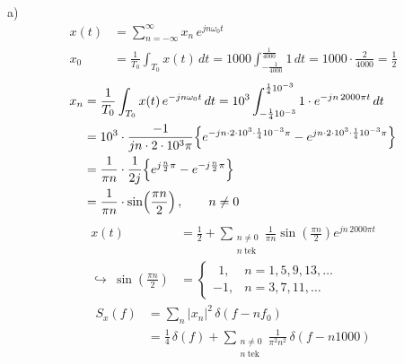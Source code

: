 \documentclass[11pt,a4paper]{article}
\begin{document}
\noindent a)
\begin{align*}
x(t)&=\sum_{n=-\infty}^{\infty}x_n\,e^{jn\omega_0 t}\\
x_0&=\frac{1}{T_0}\int_{T_0}x(t)\,dt=1000\int_{-\frac{1}{4000}}^{\frac{1}{4000}}1\,dt=1000\cdot\frac{2}{4000}=\frac12
\end{align*}
\begin{align*}
x_n &= \frac{1}{T_0}\int_{T_0}x(t)\,e^{-jn\omega_0 t}\,dt = 10^3\int_{-\frac14 10^{-3}}^{\frac14 10^{-3}}1\cdot e^{-jn\,2000\pi t}\,dt\\
 &= 10^3\cdot\frac{-1}{jn\cdot 2\cdot 10^3\pi}\Bigl\{e^{-jn\cdot 2\cdot 10^3\cdot\frac14 10^{-3}\pi}-e^{jn\cdot 2\cdot 10^3\cdot\frac14 10^{-3}\pi}\Bigr\}\\
 &= \frac{1}{\pi n}\cdot\frac{1}{2j}\Bigl\{e^{j\frac{n}{2}\pi}-e^{-j\frac{n}{2}\pi}\Bigr\}\\
 &= \frac{1}{\pi n}\cdot\sin\!\left(\frac{\pi n}{2}\right),\qquad n\neq 0
\end{align*}
\begin{align*}
x(t) &= \frac12+\sum_{\substack{n\neq 0\\ n\ \text{tek}}}\frac{1}{\pi n}\sin\!\left(\frac{\pi n}{2}\right)e^{jn\,2000\pi t}\\
\hookrightarrow\ \sin\!\left(\frac{\pi n}{2}\right) &=\begin{cases}\ \ 1, & n=1,5,9,13,\ldots\\ -1, & n=3,7,11,\ldots\end{cases}
\end{align*}
\begin{align*}
S_x(f) &= \sum_n |x_n|^2\,\delta(f-nf_0)\\
 &= \frac14\,\delta(f)+\sum_{\substack{n\neq0\\ n\ \text{tek}}}\frac{1}{\pi^2n^2}\,\delta(f-n1000)
\end{align*}
\begin{center}
\end{center}
\end{document}
